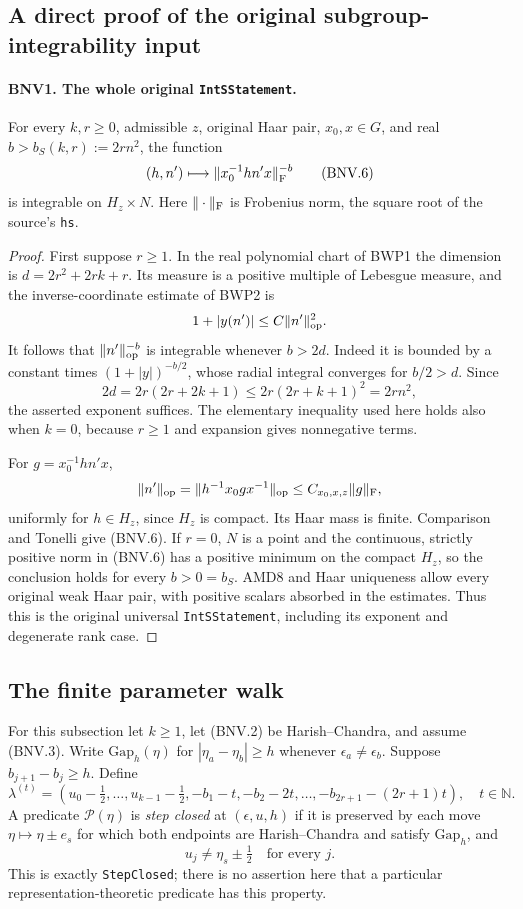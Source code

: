 \documentclass[11pt,a4paper]{article}
\numberwithin{equation}{section}
\theoremstyle{remark}\newtheorem{remark}[theorem]{Remark}
\begin{document}
\subsection{A direct proof of the original subgroup-integrability input}

\paragraph{BNV1. The whole original \texttt{Int\allowbreak SStatement}.}
\label{claim:BNV1}
For every $k,r\ge0$, admissible $z$, original Haar pair, $x_0,x\in G$, and
real $b> b_S(k,r):=2rn^2$, the function
\[
 (h,n')\longmapsto \|x_0^{-1}hn'x\|_{\rm F}^{-b}
 \tag{BNV.6}
\]
is integrable on $H_z\times N$.  Here $\|\cdot\|_{\rm F}$ is Frobenius
norm, the square root of the source's \texttt{hs}.

\begin{proof}
First suppose $r\ge1$.  In the real polynomial chart of BWP1 the dimension
is $d=2r^2+2rk+r$.  Its measure is a positive multiple of Lebesgue measure,
and the inverse-coordinate estimate of BWP2 is
\[
 1+|y(n')|\le C\|n'\|_{\rm op}^2.
\]
It follows that $\|n'\|_{\rm op}^{-b}$ is integrable whenever $b>2d$.
Indeed it is bounded by a constant times $(1+|y|)^{-b/2}$, whose radial
integral converges for $b/2>d$.  Since
\[
 2d=2r(2r+2k+1)\le2r(2r+k+1)^2=2rn^2,
\]
the asserted exponent suffices.  The elementary inequality used here holds
also when $k=0$, because $r\ge1$ and expansion gives nonnegative terms.

For $g=x_0^{-1}hn'x$,
\[
 \|n'\|_{\rm op}
 =\|h^{-1}x_0gx^{-1}\|_{\rm op}
 \le C_{x_0,x,z}\|g\|_{\rm F},
\]
uniformly for $h\in H_z$, since $H_z$ is compact.  Its Haar mass is finite.
Comparison and Tonelli give (BNV.6).  If $r=0$, $N$ is a point and the
continuous, strictly positive norm in (BNV.6) has a positive minimum on the
compact $H_z$, so the conclusion holds for every $b>0=b_S$.
AMD8 and Haar uniqueness allow every original weak Haar pair, with positive
scalars absorbed in the estimates.  Thus this is the original universal
\texttt{Int\allowbreak SStatement}, including its exponent and degenerate rank case.
\end{proof}

\subsection{The finite parameter walk}

For this subsection let $k\ge1$, let (BNV.2) be Harish--Chandra, and assume
(BNV.3).  Write $\mathrm{Gap}_h(\eta)$ for
$|\eta_a-\eta_b|\ge h$ whenever $\epsilon_a\ne\epsilon_b$.
Suppose $b_{j+1}-b_j\ge h$.  Define
\[
 \lambda^{(t)}=
 (u_0-\tfrac12,\ldots,u_{k-1}-\tfrac12,
       -b_1-t,-b_2-2t,\ldots,-b_{2r+1}-(2r+1)t),\quad t\in\mathbb N.
 \tag{BNV.7}
\]
A predicate $\mathcal P(\eta)$ is \emph{step closed} at $(\epsilon,u,h)$ if
it is preserved by each move $\eta\mapsto\eta\pm e_s$ for which both
endpoints are Harish--Chandra and satisfy $\mathrm{Gap}_h$, and
\[
 u_j\ne\eta_s\pm\tfrac12\quad\text{for every }j.
 \tag{BNV.8}
\]
This is exactly \texttt{Step\allowbreak Closed}; there is no assertion here that a
particular representation-theoretic predicate has this property.
\end{document}
